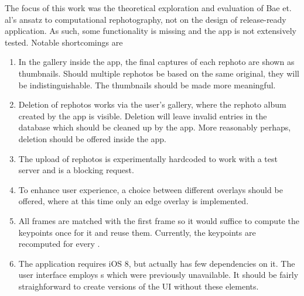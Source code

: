 The focus of this work was the theoretical exploration and evaluation of Bae et.
al's ansatz to computational rephotography, not on the design of release-ready
application. As such, some functionality is missing and the app is not
extensively tested. Notable shortcomings are
\begin{enumerate}
   \item In the gallery inside the app, the final captures of each rephoto are
      shown as thumbnails. Should multiple rephotos be based on the same
      original, they will be indistinguishable. The thumbnails should be made
      more meaningful.

   \item Deletion of rephotos works via the user's gallery, where the rephoto
      album created by the app is visible. Deletion will leave invalid entries
      in the database which should be cleaned up by the app. More reasonably
      perhaps, deletion should be offered inside the app.


   \item The upload of rephotos is experimentally hardcoded to work with a test
      server and is a blocking request.

   \item To enhance user experience, a choice between different overlays should
      be offered, where at this time only an edge overlay is implemented.

   \item All frames are matched with the first frame so it would suffice to
      compute the keypoints once for it and reuse them. Currently, the keypoints
      are recomputed for every .

   \item The application requires iOS 8, but actually has few dependencies on
      it. The user interface employs s which were
      previously unavailable. It should be fairly straighforward to create
      versions of the UI without these elements.


\end{enumerate}
